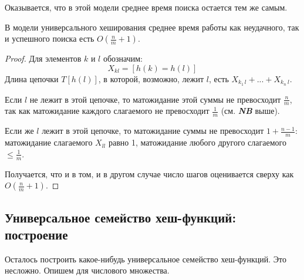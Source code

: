 Оказывается, что в этой модели среднее время поиска остается тем же самым.

\begin{theorem*}
	В модели универсального хеширования среднее время работы как неудачного, так и успешного поиска есть $O\left(\frac{n}{m}+1\right)$.
\end{theorem*}
\begin{proof}
Для элементов $k$ и $l$ обозначим:
$$X_{kl} = [h(k) = h(l)]$$
Длина цепочки $T[h(l)]$, в которой, возможно, лежит $l$, есть $X_{k_1\, l} + ... + X_{k_n\ l}$. 

Если $l$ не лежит в этой цепочке, то матожидание этой суммы не превосходит $\frac{n}{m}$, так как матожидание каждого слагаемого не превосходит $\frac{1}{m}$ (см. \textit{\textbf{NB}} выше). 

Если же $l$ лежит в этой цепочке, то матожидание суммы не превосходит $1 + \frac{n-1}{m}$: матожидание слагаемого $X_{ll}$ равно 1, матожидание любого другого слагаемого $\leq \frac{1}{m}$. 

Получается, что и в том, и в другом случае число шагов оценивается сверху как $O\left(\frac{n}{m}+1\right)$. 
\end{proof}

\subsection{Универсальное семейство хеш-функций: построение}
Осталось построить какое-нибудь универсальное семейство хеш-функций. Это несложно. Опишем для числового множества.

